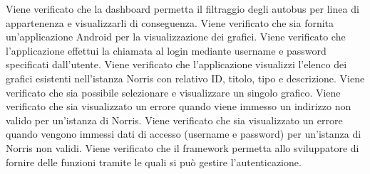 Viene verificato che la dashboard permetta il filtraggio degli autobus per linea di appartenenza e visualizzarli di conseguenza.
Viene verificato che sia fornita un'applicazione Android per la visualizzazione dei grafici.
Viene verificato che l'applicazione effettui la chiamata al login mediante username e password specificati dall'utente.
Viene verificato che l'applicazione visualizzi l'elenco dei grafici esistenti nell'istanza Norris con relativo ID, titolo, tipo e descrizione.
Viene verificato che sia possibile selezionare e visualizzare un singolo grafico.
Viene verificato che sia visualizzato un errore quando viene immesso un indirizzo non valido per un'istanza di Norris.
Viene verificato che sia visualizzato un errore quando vengono immessi dati di accesso (username e password) per un'istanza di Norris non validi.
Viene verificato che il framework permetta allo sviluppatore di fornire delle funzioni tramite le quali si può gestire l'autenticazione.
